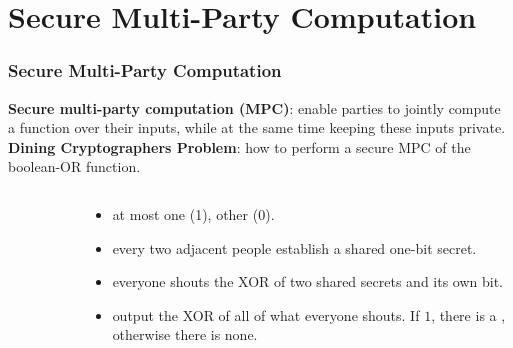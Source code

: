 \section{Secure Multi-Party Computation}
\begin{frame}\frametitle{Secure Multi-Party Computation}
\textbf{Secure multi-party computation (MPC)}: enable parties to jointly compute a function over their inputs, while at the same time keeping these inputs private.\\
\textbf{Dining Cryptographers Problem}: how to perform a secure MPC of the boolean-OR function. 
\begin{columns}
\begin{column}{4cm}
\begin{figure}
\begin{center}

\end{center}
\end{figure}
\end{column}
\begin{column}{6cm}
\begin{itemize}
\item at most one {\color{red} \LARGE \Gentsroom} (1), other {\color{blue} \LARGE \Gentsroom} (0).
\item every two adjacent people establish a shared one-bit secret.
\item everyone shouts the XOR of two shared secrets and its own bit.
\item output the XOR of all of what everyone shouts. If $1$, there is a {\color{red} \LARGE \Gentsroom}, otherwise there is none.
\end{itemize}
\end{column}
\end{columns}
\end{frame}
